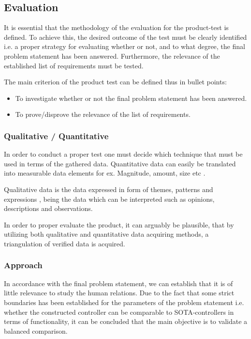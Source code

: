 \subsection{Evaluation}
It is essential that the methodology of the evaluation for the product-test is defined. To achieve this, the desired outcome of the test must be clearly identified i.e. a proper strategy for evaluating whether or not, and to what degree, the final problem statement has been answered. Furthermore, the relevance of the established list of requirements must be tested.

The main criterion of the product test can be defined thus in bullet points:
\begin{itemize}
\item To investigate whether or not the final problem statement has been answered.
\item To prove/disprove the relevance of the list of requirements.
\end{itemize}

\subsubsection{Qualitative / Quantitative }
In order to conduct a proper test one must decide which technique that must be used in terms of the gathered data. Quantitative data can easily be translated into measurable data elements for ex. Magnitude, amount, size etc \parencite{Rogers2002}.

Qualitative data is the data expressed in form of themes, patterns and expressions \parencite{Rogers2002}, being the data which can be interpreted such as opinions, descriptions and observations.

In order to proper evaluate the product, it can arguably be plausible, that by utilizing both qualitative and quantitative data acquiring methods, a triangulation of verified data is acquired.

\subsubsection{Approach} \label{sec:approach}
In accordance with the final problem statement, we can establish that it is of little relevance to study the human relations. Due to the fact that some strict boundaries has been established for the parameters of the problem statement i.e. whether the constructed controller can be comparable to SOTA-controllers in terms of functionality, it can be concluded that the main objective is to validate a balanced comparison. 
\bigskip

